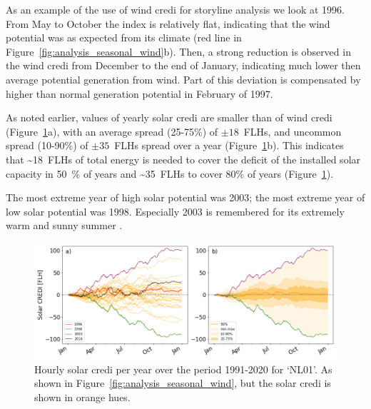 \documentclass[a4paper,11pt]{extarticle}
\newcommand{\sdi}[0]{{\sc solar credi}}
\newcommand{\wdi}[0]{{\sc wind credi}}
\begin{document}
As an example of the use of \wdi{} for storyline analysis we look at 1996. From May to October the index is relatively flat, indicating that the wind potential was as expected from its climate (red line in Figure~\ref{fig:analysis_seasonal_wind}b). 
Then, a strong reduction is observed in the \wdi{} from December to the end of January, indicating much lower then average potential generation from wind. Part of this deviation is compensated by higher than normal generation potential in February of 1997.

As noted earlier, values of yearly \sdi{} are smaller than of \wdi{} (Figure~\ref{fig:analysis_seasonal_solar}a), with an average spread (25-75\%) of $\pm18$~FLHs, and uncommon spread (10-90\%) of $\pm35$~FLHs spread over a year (Figure~\ref{fig:analysis_seasonal_solar}b). 
This indicates that \textasciitilde18~FLHs of total energy is needed to cover the deficit of the installed solar capacity in 50~\% of years and \textasciitilde35~FLHs to cover 80\% of years (Figure~\ref{fig:analysis_seasonal_solar}). 

The most extreme year of high solar potential was 2003; the most extreme year of low solar potential was 1998. 
Especially 2003 is remembered for its extremely warm and sunny summer \parencite{GarcaHerrera2010}.

\begin{figure}[t]
        \centering
        \includegraphics[width=\textwidth]{SolarCREDI_annual} 
        \caption{
                Hourly \sdi{} per year over the period 1991-2020 for `NL01'. 
                As shown in Figure~\ref{fig:analysis_seasonal_wind}, but the \sdi{} is shown in orange hues.
        }
        \label{fig:analysis_seasonal_solar}
\end{figure}







\end{document}
